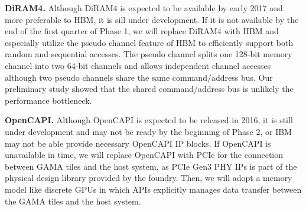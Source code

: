 \noindent
\textbf{DiRAM4.} Although DiRAM4 is expected to be available by early 2017 and more preferable to HBM, it is sill under development.
If it is not available by the end of the first quarter of Phase 1, we will replace DiRAM4 with HBM and especially utilize the pseudo channel feature of HBM to efficiently support both random and sequential accesses. 
The pseudo channel splits one 128-bit memory channel into two 64-bit channels and allows independent channel accesses although two pseudo channels share the same command/address bus.
Our preliminary study showed that the shared command/address bus is unlikely the performance bottleneck.


\vspace{3pt}
\noindent
\textbf{OpenCAPI.} Although OpenCAPI is expected to be released in 2016, it is still under development and may not be ready by the beginning of Phase 2, or IBM may not be able provide necessary OpenCAPI IP blocks.
If OpenCAPI is unavailable in time, we will replace OpenCAPI with PCIe for the connection between GAMA tiles and the host system, as PCIe Gen3 PHY IPs is part of the physical design library provided by the foundry.
Then, we will adopt a memory model like discrete GPUs in which APIs explicitly manages data transfer between the GAMA tiles and the host system.


